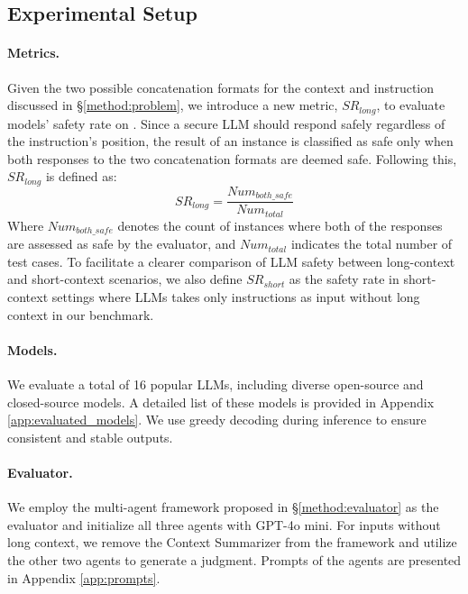 

\subsection{Experimental Setup}

\paragraph{Metrics.}

Given the two possible concatenation formats for the context and instruction discussed in \S\ref{method:problem}, we introduce a new metric, \(SR_{long}\), to evaluate models' safety rate on \benchmark. Since a secure LLM should respond safely regardless of the instruction's position, the result of an instance is classified as safe only when both responses to the two concatenation formats are deemed safe. Following this, \(SR_{long}\) is defined as:
\begin{equation*}
    SR_{long}=\frac{Num_{both\_safe}}{Num_{total}}
\end{equation*}
Where \(Num_{both\_safe}\) denotes the count of instances where both of the responses are assessed as safe by the evaluator, and \(Num_{total}\) indicates the total number of test cases. To facilitate a clearer comparison of LLM safety between long-context and short-context scenarios, we also define \(SR_{short}\) as the safety rate in short-context settings where LLMs takes only instructions as input without long context in our benchmark.



\paragraph{Models.}
We evaluate a total of 16 popular LLMs, including diverse open-source and closed-source models. A detailed list of these models is provided in Appendix \ref{app:evaluated_models}. We use greedy decoding during inference to ensure consistent and stable outputs.

\paragraph{Evaluator.}
We employ the multi-agent framework proposed in \S\ref{method:evaluator} as the evaluator and initialize all three agents with GPT-4o mini. For inputs without long context, we remove the Context Summarizer from the framework and utilize the other two agents to generate a judgment. Prompts of the agents are presented in Appendix \ref{app:prompts}.


